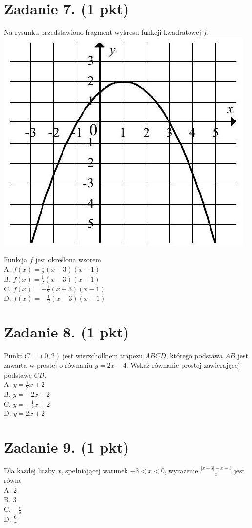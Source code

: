 \documentclass[10pt]{article}
\begin{document}
\section*{Zadanie 7. (1 pkt)}
Na rysunku przedstawiono fragment wykresu funkcji kwadratowej \(f\).\\
\includegraphics[max width=\textwidth, center]{2024_11_21_0c267759828927e3a26dg-04}

Funkcja \(f\) jest określona wzorem\\
A. \(f(x)=\frac{1}{2}(x+3)(x-1)\)\\
B. \(f(x)=\frac{1}{2}(x-3)(x+1)\)\\
C. \(f(x)=-\frac{1}{2}(x+3)(x-1)\)\\
D. \(f(x)=-\frac{1}{2}(x-3)(x+1)\)

\section*{Zadanie 8. (1 pkt)}
Punkt \(C=(0,2)\) jest wierzchołkiem trapezu \(A B C D\), którego podstawa \(A B\) jest zawarta w prostej o równaniu \(y=2 x-4\). Wskaż równanie prostej zawierającej podstawę \(C D\).\\
A. \(y=\frac{1}{2} x+2\)\\
B. \(y=-2 x+2\)\\
C. \(y=-\frac{1}{2} x+2\)\\
D. \(y=2 x+2\)

\section*{Zadanie 9. (1 pkt)}
Dla każdej liczby \(x\), spełniającej warunek \(-3<x<0\), wyrażenie \(\frac{|x+3|-x+3}{x}\) jest równe\\
A. 2\\
B. 3\\
C. \(-\frac{6}{x}\)\\
D. \(\frac{6}{x}\)
\end{document}
